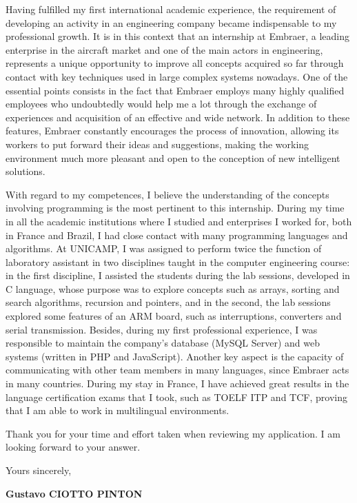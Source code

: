 \documentclass[12pt, a4paper]{article}
\begin{document}
\vspace{12pt}

Having fulfilled my first international academic experience, the requirement of
developing an activity in an engineering company became indispensable to my
professional growth. It is in this context that an internship at Embraer, a
leading enterprise in the aircraft market and one of the main actors in
engineering, represents a unique opportunity to improve all concepts acquired
so far through contact with key techniques used in large complex systems
nowadays.  One of the essential points consists in the fact that Embraer employs
many highly qualified employees who undoubtedly would help me a lot through
the exchange of experiences and acquisition of an effective and wide
network. In addition  to these features, Embraer constantly encourages
the process of innovation, allowing its workers to put forward their ideas and
suggestions, making the working environment much more pleasant and open to the
conception of new intelligent solutions. 


\vspace{12pt} 

With regard to my competences,  I believe the understanding of the concepts
involving programming is the most pertinent to this internship. During my time
in all the academic institutions where I studied and enterprises I worked for,
both in France and Brazil, I had close contact with many programming languages
and algorithms. At UNICAMP, I was assigned to perform twice the function of
laboratory assistant in two disciplines taught in the computer engineering
course: in the first discipline, I assisted the students during the lab
sessions, developed in C language, whose purpose was to explore concepts such as
arrays, sorting and search algorithms, recursion and pointers, and in
the second, the lab sessions explored some features of an ARM board, such as
interruptions, converters and serial transmission. Besides, during my first
professional experience, I was responsible to maintain the company's database
(MySQL Server) and web systems (written in PHP and
JavaScript). Another key aspect is the capacity of communicating with
other team members in many languages, since Embraer acts in many countries.
During my stay in France, I have achieved great results in the language certification exams that I took, such as TOELF ITP and
TCF, proving that I am able to work in multilingual environments.

	
\vspace{12pt}

Thank you for your time and effort taken when reviewing my application. I am
looking forward to your answer.

\vspace{12pt}

Yours sincerely,

\begin{flushright}
\textbf{Gustavo CIOTTO PINTON}
\end{flushright}
\end{document}
